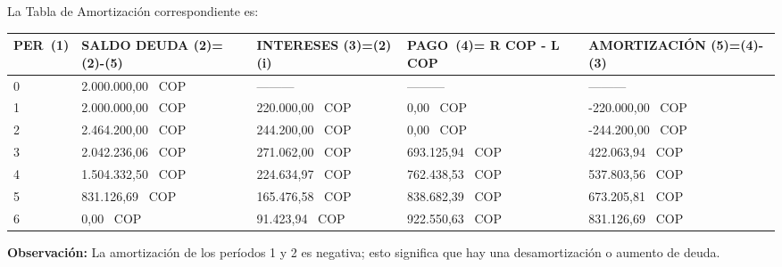 La Tabla de Amortización correspondiente es:
\begin{spacing}{1.1}
	\begin{center}
    \footnotesize
		\begin{tabular}{|p{1cm}|p{2.5cm}|p{2.5cm}|p{2.5cm}|p{3cm}|}
			\hline
			\rowcolor{white!50}
			\textbf{PER\ (1)} & \textbf{SALDO DEUDA (2)=(2)-(5)} & \textbf{INTERESES  (3)=(2)(i)} & \textbf{PAGO\ (4)= R COP - L COP} & \textbf{AMORTIZACIÓN  (5)=(4)-(3)} \\ \hline
			
			0                 &  2.000.000,00 \ COP                  & ---------                       & ---------                   & ---------                          \\ \hline
			1                 &  2.000.000,00 \ COP                   &  220.000,00 \ COP                   & 0,00 \ COP                      &  -220.000,00 \ COP                      \\ \hline
			2                 &  2.464.200,00 \ COP                   &  244.200,00 \ COP                   &  0,00 \ COP                      &  -244.200,00 \ COP                      \\ \hline
			3                 &  2.042.236,06 \ COP                   &  271.062,00 \ COP                    &  693.125,94 \ COP                &  422.063,94 \ COP                       \\ \hline
			4                 &  1.504.332,50 \ COP                   &  224.634,97 \ COP                    &  762.438,53 \ COP                &  537.803,56 \ COP                       \\ \hline
			5                 &  831.126,69 \ COP                     &  165.476,58 \ COP                    &  838.682,39 \ COP                &  673.205,81 \ COP                       \\ \hline
			6                 &  0,00 \ COP                           &  91.423,94 \ COP                     &  922.550,63 \ COP                &  831.126,69 \ COP                       \\ \hline
		\end{tabular}
	\end{center}
\end{spacing}

\textbf{Observación: } La amortización de los períodos 1 y 2 es negativa; esto significa que hay una desamortización o aumento de deuda.\\


	
